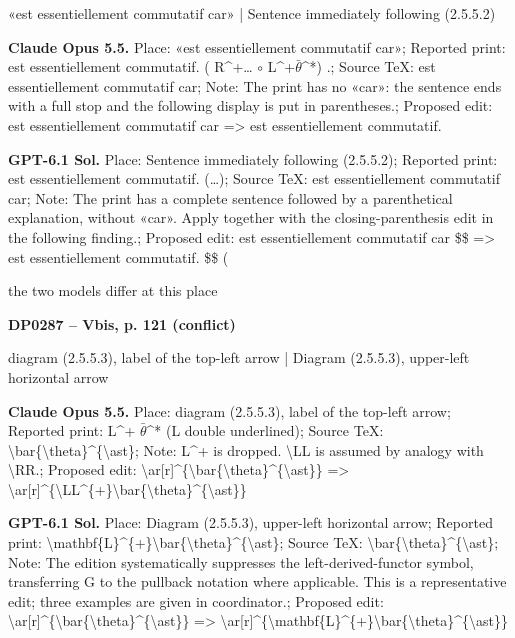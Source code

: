 «est essentiellement commutatif car» | Sentence immediately following (2.5.5.2)\par
\textbf{Claude Opus 5.5.} Place: «est essentiellement commutatif car»; Reported print: est essentiellement commutatif.  ( R\textasciicircum{}+… \ensuremath{\circ} L\textasciicircum{}+\ensuremath{\bar{\theta}}\textasciicircum{}*) .; Source TeX: est essentiellement commutatif car; Note: The print has no «car»: the sentence ends with a full stop and the following display is put in parentheses.; Proposed edit: est essentiellement commutatif car =\allowbreak > est essentiellement commutatif.\par
\textbf{GPT-6.1 Sol.} Place: Sentence immediately following (2.5.5.2); Reported print: est essentiellement commutatif. (…); Source TeX: est essentiellement commutatif car; Note: The print has a complete sentence followed by a parenthetical explanation, without «car». Apply together with the closing-parenthesis edit in the following finding.; Proposed edit: est essentiellement commutatif car \$\$ =\allowbreak > est essentiellement commutatif. \$\$ (\par
the two models differ at this place\par
\par\noindent\hypertarget{DP0287}{}\textbf{DP0287 -- Vbis, p. 121 (conflict)}\par
diagram (2.5.5.3), label of the top-left arrow | Diagram (2.5.5.3), upper-left horizontal arrow\par
\textbf{Claude Opus 5.5.} Place: diagram (2.5.5.3), label of the top-left arrow; Reported print: L\textasciicircum{}+ \ensuremath{\bar{\theta}}\textasciicircum{}* (L double underlined); Source TeX: \textbackslash{}bar\{\textbackslash{}theta\}\textasciicircum{}\{\textbackslash{}ast\}; Note: L\textasciicircum{}+ is dropped. \textbackslash{}LL is assumed by analogy with \textbackslash{}RR.; Proposed edit: \textbackslash{}ar[r]\textasciicircum{}\{\textbackslash{}bar\{\textbackslash{}theta\}\textasciicircum{}\{\textbackslash{}ast\}\} =\allowbreak > \textbackslash{}ar[r]\textasciicircum{}\{\textbackslash{}LL\textasciicircum{}\{+\}\textbackslash{}bar\{\textbackslash{}theta\}\textasciicircum{}\{\textbackslash{}ast\}\}\par
\textbf{GPT-6.1 Sol.} Place: Diagram (2.5.5.3), upper-left horizontal arrow; Reported print: \textbackslash{}mathbf\{L\}\textasciicircum{}\{+\}\textbackslash{}bar\{\textbackslash{}theta\}\textasciicircum{}\{\textbackslash{}ast\}; Source TeX: \textbackslash{}bar\{\textbackslash{}theta\}\textasciicircum{}\{\textbackslash{}ast\}; Note: The edition systematically suppresses the left-derived-functor symbol, transferring G to the pullback notation where applicable. This is a representative edit; three examples are given in coordinator.; Proposed edit: \textbackslash{}ar[r]\textasciicircum{}\{\textbackslash{}bar\{\textbackslash{}theta\}\textasciicircum{}\{\textbackslash{}ast\}\} =\allowbreak > \textbackslash{}ar[r]\textasciicircum{}\{\textbackslash{}mathbf\{L\}\textasciicircum{}\{+\}\textbackslash{}bar\{\textbackslash{}theta\}\textasciicircum{}\{\textbackslash{}ast\}\}\par
